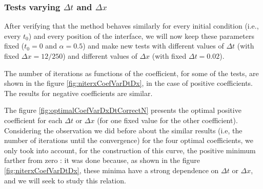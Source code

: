 \subsubsection{Tests varying $\Delta t$ and $\Delta x$}

\indent After verifying that the method behaves similarly for every initial condition (i.e., every $t_0$) and every position of the interface, we will now keep these parameters fixed ($t_0 = 0$ and $\alpha = 0.5$) and make new tests with different values of $\Delta t$ (with fixed $\Delta x = 12/250$) and different values of $\Delta x$ (with fixed $\Delta t = 0.02$).

\indent The number of iterations as functions of the coefficient, for some of the tests, are shown in the figure \ref{fig:niterxCoefVarDtDx}, in the case of positive coefficients. The results for negative coefficients are similar.

\indent The figure \ref{fig:optimalCoefVarDxDtCorrectN} presents the optimal positive coefficient for each $\Delta t$ or $\Delta x$ (for one fixed value for the other coefficient). Considering the observation we did before about the similar results (i.e, the number of iterations until the convergence) for the four optimal coefficients, we only took into account, for the construction of this curve, the positive minimum farther from zero : it was done because, as shown  in the figure \ref{fig:niterxCoefVarDtDx}, these minima have a strong dependence on $\Delta t$ or $\Delta x$, and we will seek to study this relation.

